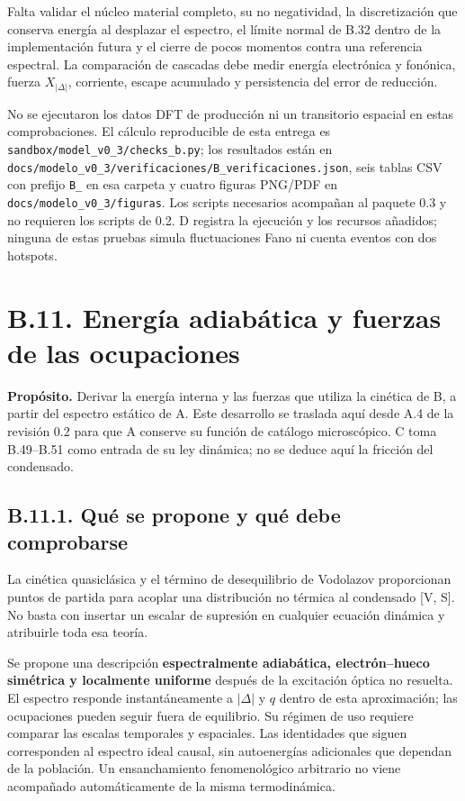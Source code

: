 \documentclass[
  spanish,
  10pt,
  a4paper,
]{article}
\begin{document}
Falta validar el núcleo material completo, su no negatividad, la
discretización que conserva energía al desplazar el espectro, el límite
normal de B.32 dentro de la implementación futura y el cierre de pocos
momentos contra una referencia espectral. La comparación de cascadas
debe medir energía electrónica y fonónica, fuerza \(X_{|\Delta|}\),
corriente, escape acumulado y persistencia del error de reducción.

No se ejecutaron los datos DFT de producción ni un transitorio espacial
en estas comprobaciones. El cálculo reproducible de esta entrega es
\nolinkurl{sandbox/model_v0_3/checks_b.py}; los resultados están en
\nolinkurl{docs/modelo_v0_3/verificaciones/B_verificaciones.json}, seis
tablas CSV con prefijo \nolinkurl{B_} en esa carpeta y cuatro figuras
PNG/PDF en \nolinkurl{docs/modelo_v0_3/figuras}. Los scripts necesarios
acompañan al paquete 0.3 y no requieren los scripts de 0.2. D registra
la ejecución y los recursos añadidos; ninguna de estas pruebas simula
fluctuaciones Fano ni cuenta eventos con dos hotspots.

\section{B.11. Energía adiabática y fuerzas de las
ocupaciones}\label{b.11.-energuxeda-adiabuxe1tica-y-fuerzas-de-las-ocupaciones}

\textbf{Propósito.} Derivar la energía interna y las fuerzas que utiliza
la cinética de B, a partir del espectro estático de A. Este desarrollo
se traslada aquí desde A.4 de la revisión 0.2 para que A conserve su
función de catálogo microscópico. C toma B.49--B.51 como entrada de su
ley dinámica; no se deduce aquí la fricción del condensado.

\subsection{B.11.1. Qué se propone y qué debe
comprobarse}\label{b.11.1.-quuxe9-se-propone-y-quuxe9-debe-comprobarse}

La cinética quasiclásica y el término de desequilibrio de Vodolazov
proporcionan puntos de partida para acoplar una distribución no térmica
al condensado {[}V, S{]}. No basta con insertar un escalar de supresión
en cualquier ecuación dinámica y atribuirle toda esa teoría.

Se propone una descripción \textbf{espectralmente adiabática,
electrón--hueco simétrica y localmente uniforme} después de la
excitación óptica no resuelta. El espectro responde instantáneamente a
\(|\Delta|\) y \(q\) dentro de esta aproximación; las ocupaciones pueden
seguir fuera de equilibrio. Su régimen de uso requiere comparar las
escalas temporales y espaciales. Las identidades que siguen corresponden
al espectro ideal causal, sin autoenergías adicionales que dependan de
la población. Un ensanchamiento fenomenológico arbitrario no viene
acompañado automáticamente de la misma termodinámica.
\end{document}
